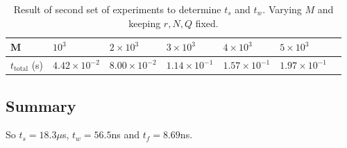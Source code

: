 \begin{table}[h]
	\centering
	\caption{Result of second set of experiments to determine $t_s$ and $t_w$. Varying $M$ and keeping $r, N, Q$ fixed.}
	\label{tab3}
	\begin{tabular}{lllllll}
		\hline
		M                        & $10^3$ & $2\times10^3$ & $3\times10^3$ & $4\times10^3$ & $5\times10^3$ \\ \hline
		$t_{\textrm{total}}$ (s) & $4.42\times 10^{-2}$ & $8.00\times 10^{-2}$ & $1.14\times 10^{-1}$ & $1.57\times 10^{-1}$ & $1.97\times 10^{-1}$ \\ \hline
	\end{tabular}
\end{table}

\subsection{Summary}
So $t_s = 18.3\mu$s, $t_w = 56.5$ns and $t_f = 8.69$ns.
